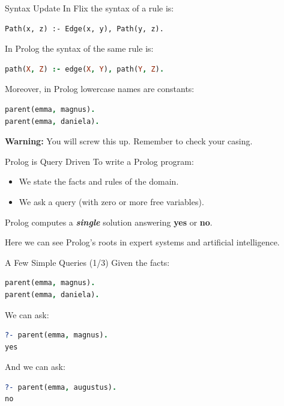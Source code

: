 \begin{frame}[fragile]{Syntax Update}
In Flix the syntax of a rule is:

\begin{lstlisting}[language=flix, xleftmargin=0.5cm]
Path(x, z) :- Edge(x, y), Path(y, z).
\end{lstlisting}

In Prolog the syntax of the same rule is:

\begin{lstlisting}[language=prolog, xleftmargin=0.5cm]
path(X, Z) :- edge(X, Y), path(Y, Z).
\end{lstlisting}

\pause

Moreover, in Prolog lowercase names are constants:

\begin{lstlisting}[language=prolog, xleftmargin=0.5cm]
parent(emma, magnus).
parent(emma, daniela).
\end{lstlisting}

\pause

\textbf{Warning:} You will screw this up. Remember to check your casing. 
\end{frame}

\begin{frame}{Prolog is Query Driven}
To write a Prolog program: 

\begin{itemize}
    \item We state the facts and rules of the domain.
    \item We ask a query (with zero or more free variables).
\end{itemize}

Prolog computes a \textbf{\emph{single}} solution answering \textbf{yes} or \textbf{no}.

\medskip

Here we can see Prolog's roots in expert systems and artificial intelligence.
\end{frame}

\begin{frame}[fragile]{A Few Simple Queries (1/3)}
Given the facts:

\begin{lstlisting}[language=prolog, xleftmargin=0.5cm]
parent(emma, magnus).
parent(emma, daniela).
\end{lstlisting}

\pause

We can ask:

\begin{lstlisting}[language=prolog, xleftmargin=0.5cm]
?- parent(emma, magnus).
yes
\end{lstlisting}

\pause

And we can ask:

\begin{lstlisting}[language=prolog, xleftmargin=0.5cm]
?- parent(emma, augustus).
no
\end{lstlisting}
\end{frame}

